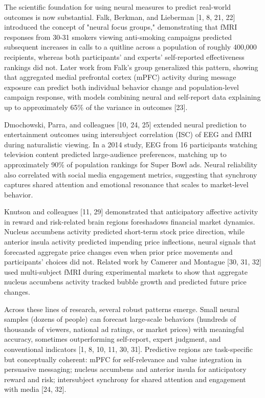 \documentclass[11pt,letterpaper]{article}
\begin{document}
The scientific foundation for using neural measures to predict real-world outcomes is now substantial. Falk, Berkman, and Lieberman [1, 8, 21, 22] introduced the concept of "neural focus groups," demonstrating that fMRI responses from 30-31 smokers viewing anti-smoking campaigns predicted subsequent increases in calls to a quitline across a population of roughly 400,000 recipients, whereas both participants' and experts' self-reported effectiveness rankings did not. Later work from Falk's group generalized this pattern, showing that aggregated medial prefrontal cortex (mPFC) activity during message exposure can predict both individual behavior change and population-level campaign response, with models combining neural and self-report data explaining up to approximately 65\% of the variance in outcomes [23].

Dmochowski, Parra, and colleagues [10, 24, 25] extended neural prediction to entertainment outcomes using intersubject correlation (ISC) of EEG and fMRI during naturalistic viewing. In a 2014 study, EEG from 16 participants watching television content predicted large-audience preferences, matching up to approximately 90\% of population rankings for Super Bowl ads. Neural reliability also correlated with social media engagement metrics, suggesting that synchrony captures shared attention and emotional resonance that scales to market-level behavior.

Knutson and colleagues [11, 29] demonstrated that anticipatory affective activity in reward and risk-related brain regions foreshadows financial market dynamics. Nucleus accumbens activity predicted short-term stock price direction, while anterior insula activity predicted impending price inflections, neural signals that forecasted aggregate price changes even when prior price movements and participants' choices did not. Related work by Camerer and Montague [30, 31, 32] used multi-subject fMRI during experimental markets to show that aggregate nucleus accumbens activity tracked bubble growth and predicted future price changes.

Across these lines of research, several robust patterns emerge. Small neural samples (dozens of people) can forecast large-scale behaviors (hundreds of thousands of viewers, national ad ratings, or market prices) with meaningful accuracy, sometimes outperforming self-report, expert judgment, and conventional indicators [1, 8, 10, 11, 30, 31]. Predictive regions are task-specific but conceptually coherent: mPFC for self-relevance and value integration in persuasive messaging; nucleus accumbens and anterior insula for anticipatory reward and risk; intersubject synchrony for shared attention and engagement with media [24, 32].
\end{document}
